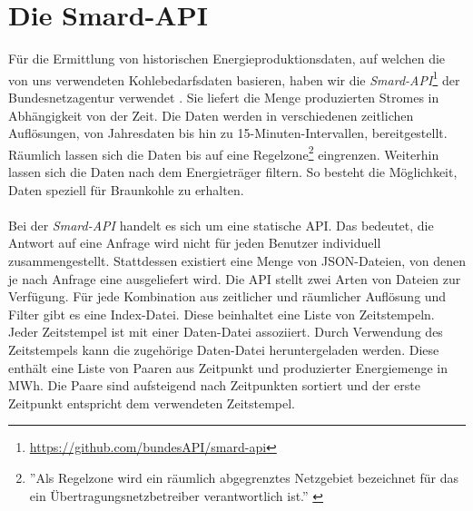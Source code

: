 \section{Die Smard-API}

Für die Ermittlung von historischen Energieproduktionsdaten, auf welchen die von uns verwendeten Kohlebedarfsdaten basieren, haben wir die \emph{Smard-API}\footnote{\url{https://github.com/bundesAPI/smard-api}} der Bundesnetzagentur verwendet \cite{noauthor_bundesapismard-api_nodate}. Sie liefert die Menge produzierten Stromes in Abhängigkeit von der Zeit. Die Daten werden in verschiedenen zeitlichen Auflösungen, von Jahresdaten bis hin zu 15-Minuten-Intervallen, bereitgestellt. Räumlich lassen sich die Daten bis auf eine Regelzone\footnote{''Als Regelzone wird ein räumlich abgegrenztes Netzgebiet bezeichnet für das ein Übertragungsnetzbetreiber verantwortlich ist.'' \cite{noauthor_smard_nodate}} eingrenzen. Weiterhin lassen sich die Daten nach dem Energieträger filtern. So besteht die Möglichkeit, Daten speziell für Braunkohle zu erhalten.\\
\\
Bei der \emph{Smard-API} handelt es sich um eine statische API. Das bedeutet, die Antwort auf eine Anfrage wird nicht für jeden Benutzer individuell zusammengestellt. Stattdessen existiert eine Menge von JSON-Dateien, von denen je nach Anfrage eine ausgeliefert wird. Die API stellt zwei Arten von Dateien zur Verfügung. Für jede Kombination aus zeitlicher und räumlicher Auflösung und Filter gibt es eine Index-Datei. Diese beinhaltet eine Liste von Zeitstempeln. Jeder Zeitstempel ist mit einer Daten-Datei assoziiert. Durch Verwendung des Zeitstempels kann die zugehörige Daten-Datei heruntergeladen werden. Diese enthält eine Liste von Paaren aus Zeitpunkt und produzierter Energiemenge in MWh. Die Paare sind aufsteigend nach Zeitpunkten sortiert und der erste Zeitpunkt entspricht dem verwendeten Zeitstempel.